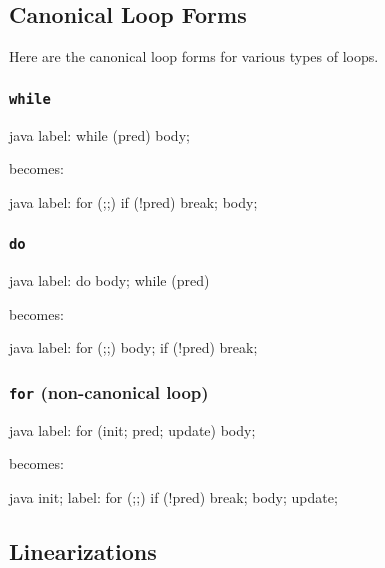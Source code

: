 \documentclass[journal,a4paper]{IEEEtran}
\begin{document}
\appendix
\subsection{Canonical Loop Forms} \label{appendix:canonical-loop-forms}

Here are the canonical loop forms for various types of loops.

\subsubsection{\texttt{while}}

\begin{pygmented}{java}
label: while (pred) {
    body;
}
\end{pygmented}

becomes:

\begin{pygmented}{java}
label: for (;;) {
    if (!pred) break; body;
}
\end{pygmented}

\subsubsection{\texttt{do}}

\begin{pygmented}{java}
label: do {
    body;
} while (pred)
\end{pygmented}

becomes:

\begin{pygmented}{java}
label: for (;;) {
    body; if (!pred) break;
}
\end{pygmented}

\subsubsection{\texttt{for} (non-canonical loop)}

\begin{pygmented}{java}
label: for (init; pred; update) {
    body;
}
\end{pygmented}

becomes:

\begin{pygmented}{java}
{
    init;
    label: for (;;) {
        if (!pred) break; body;
        update;
    }
}
\end{pygmented}

\subsection{Linearizations} \label{appendix:linearizations}
\end{document}
